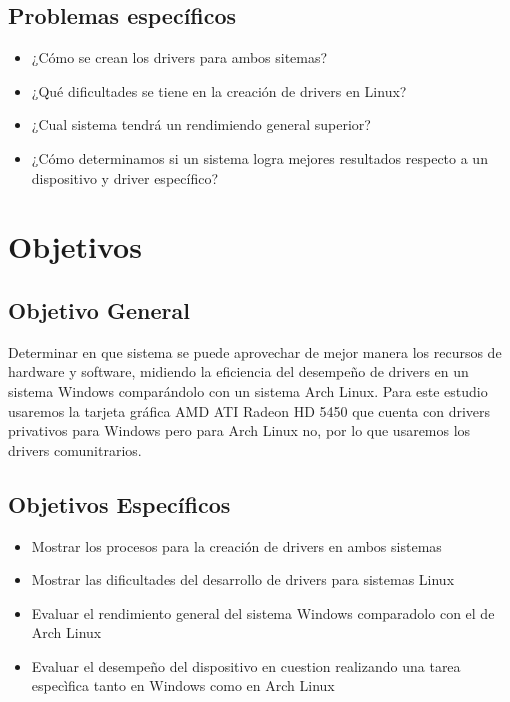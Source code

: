 \documentclass[conference]{IEEEtran}
\begin{document}
\subsection{Problemas específicos}
\begin{itemize}
    \item ¿Cómo se crean los drivers para ambos sitemas?
    \item ¿Qué dificultades se tiene en la creación de drivers en Linux?
    \item ¿Cual sistema tendrá un rendimiendo general superior?
    \item ¿Cómo determinamos si un sistema logra mejores resultados  respecto a un dispositivo y driver específico?
\end{itemize}

\section{Objetivos}
\subsection{Objetivo General}

Determinar en que sistema se puede aprovechar de mejor manera los recursos de hardware y software, midiendo la eficiencia  del desempeño de drivers en un sistema Windows comparándolo con un sistema Arch Linux.
Para este estudio usaremos la tarjeta gráfica AMD ATI Radeon HD 5450 que cuenta con drivers privativos para Windows  pero para Arch Linux no, por lo que usaremos los drivers comunitrarios.
\subsection{Objetivos Específicos}
\begin{itemize}
    \item Mostrar los procesos para la creación de drivers en ambos sistemas
    \item Mostrar las dificultades del desarrollo de drivers para sistemas Linux
    \item Evaluar el rendimiento general del sistema Windows comparadolo con el de Arch Linux
    \item Evaluar el desempeño del dispositivo en cuestion realizando una tarea especìfica tanto en Windows como en Arch Linux
    
\end{itemize}
\end{document}
